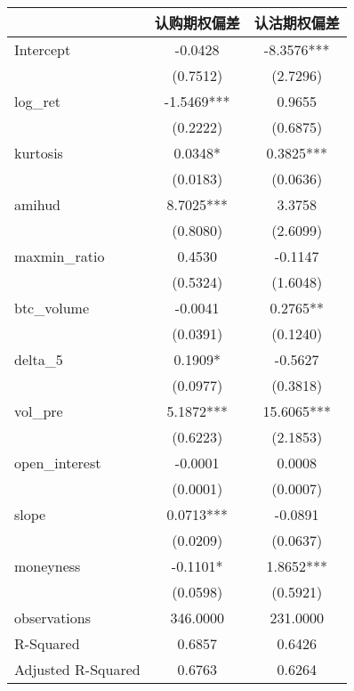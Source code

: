 \begin{tabular}{lcc}
\hline
                   &   认购期权偏差   &   认沽期权偏差    \\
\midrule
\midrule
Intercept          & -0.0428    & -8.3576***  \\
                   & (0.7512)   & (2.7296)    \\
log\_ret           & -1.5469*** & 0.9655      \\
                   & (0.2222)   & (0.6875)    \\
kurtosis           & 0.0348*    & 0.3825***   \\
                   & (0.0183)   & (0.0636)    \\
amihud             & 8.7025***  & 3.3758      \\
                   & (0.8080)   & (2.6099)    \\
maxmin\_ratio      & 0.4530     & -0.1147     \\
                   & (0.5324)   & (1.6048)    \\
btc\_volume        & -0.0041    & 0.2765**    \\
                   & (0.0391)   & (0.1240)    \\
delta\_5           & 0.1909*    & -0.5627     \\
                   & (0.0977)   & (0.3818)    \\
vol\_pre           & 5.1872***  & 15.6065***  \\
                   & (0.6223)   & (2.1853)    \\
open\_interest     & -0.0001    & 0.0008      \\
                   & (0.0001)   & (0.0007)    \\
slope              & 0.0713***  & -0.0891     \\
                   & (0.0209)   & (0.0637)    \\
moneyness          & -0.1101*   & 1.8652***   \\
                   & (0.0598)   & (0.5921)    \\
observations       & 346.0000   & 231.0000    \\
R-Squared          & 0.6857     & 0.6426      \\
Adjusted R-Squared & 0.6763     & 0.6264      \\
\hline
\end{tabular}